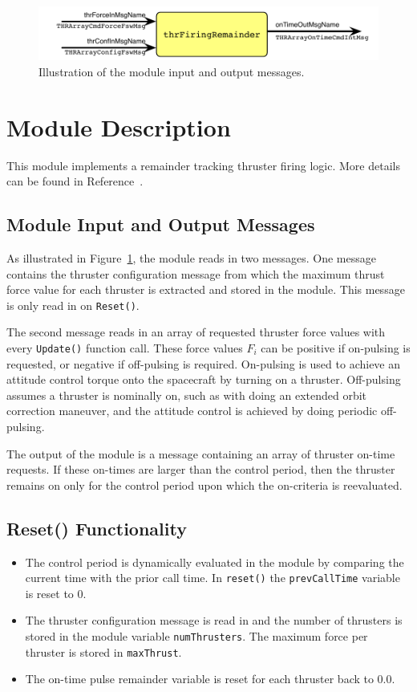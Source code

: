 

\begin{figure}[h]
	\centerline{
		\includegraphics{Figures/moduleImg}
	}
	\caption{Illustration of the module input and output messages.}
	\label{fig:moduleImg}
\end{figure}


\section{Module Description}
This module implements a remainder tracking thruster firing logic.  More details can be found in Reference~.  

\subsection{Module Input and Output Messages}
As illustrated in Figure~\ref{fig:moduleImg}, the module reads in two messages.  One message contains the thruster configuration message from which the maximum thrust force value for each thruster is extracted and stored in the module.  This message is only read in on {\tt Reset()}.  

The second message reads in an array of requested thruster force values with every {\tt Update()} function call.  These force values $F_{i}$ can be positive if on-pulsing is requested, or negative if off-pulsing is required.  On-pulsing is used to achieve an attitude control torque onto the spacecraft by turning on a thruster.  Off-pulsing assumes a thruster is nominally on, such as with doing an extended orbit correction maneuver, and the attitude control is achieved by doing periodic off-pulsing.  

The output of the module is a message containing an array of thruster on-time requests.  If these on-times are larger than the control period, then the thruster remains on only for the control period upon which the on-criteria is reevaluated.  


\subsection{Reset() Functionality}
\begin{itemize}
	\item The control period is dynamically evaluated in the module by comparing the current time with the prior call time.  In {\tt reset()} the {\tt prevCallTime} variable is reset to 0.  
	\item The thruster configuration message is read in and the number of thrusters is stored in the module variable {\tt numThrusters}.  The maximum force per thruster is stored in {\tt maxThrust}.
	\item The on-time pulse remainder variable is reset for each thruster back to 0.0.
\end{itemize}

